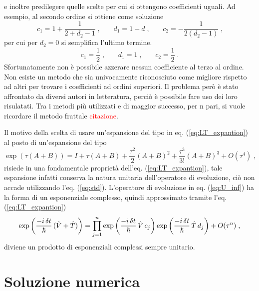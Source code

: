 e inoltre predilegere quelle scelte per cui si ottengono coefficienti uguali.
Ad esempio, al secondo ordine si ottiene come soluzione
\begin{equation}
    c_{1} = 1 + \frac{1}{2 + d_{2} -1}  \; \text{,} \qquad  d_{1} = 1 -d  \; \text{,} \qquad c_{2} = - \frac{1}{2(d_{2}-1)}  \; \text{,} 
    \label{eq:2_order_sol}
\end{equation}
per cui per $d_2 = 0$ si semplifica l'ultimo termine.
\begin{equation}
    c_{1} = \frac{1}{2} \; \text{,}  \qquad 
    d_{1} = 1 \; \text{,}  \qquad
    c_{2} = \frac{1}{2}  \; \text{.}
\end{equation}
Sfortunatamente non è possibile azzerare nessun coefficiente al terzo al ordine.
Non esiste un metodo che sia univocamente riconosciuto come migliore rispetto ad altri per trovare i coefficienti ad ordini superiori. Il problema però è stato affrontato da diversi autori in letteratura, perciò è possibile fare uso dei loro risulatati. Tra i metodi più utilizzati e di maggior successo, per n pari, si vuole ricordare il metodo frattale \textcolor{red}{citazione}.

Il motivo della scelta di usare un'espansione del tipo in eq. (\ref{eq:LT_expantion}) al posto di un'espansione del tipo 
\begin{equation}
         \exp \left(\tau ({A} + {B})\right) = I + \tau(A + B) + \frac{\tau^{2}}{2} (A + B)^2 + \frac{\tau^{3}}{3!} (A + B)^3 + O(\tau^{4})  \; \text{,} 
    \label{eq:std}
\end{equation}
risiede in una fondamentale proprietà dell'eq. (\ref{eq:LT_expantion}), tale espansione infatti conserva la natura unitaria dell'operatore di evoluzione, ciò non accade utilizzando l'eq. (\ref{eq:std})\cite{Hatano:exp}.
L'operatore di evoluzione in eq. (\ref{eq:U_inf}) ha la forma di un esponenziale complesso, quindi approssimato tramite l'eq. (\ref{eq:LT_expantion}) 
\begin{equation}
    \centering
     \exp \left(\frac{-i \, \delta t }{\hbar}  \, (\hat{V} + \hat{T})\right)   = \prod _{j=1} ^{n}  \exp \left(\frac{-i \, \delta t }{\hbar} \, \hat{V} \, c_{j}\right)   \exp \left(\frac{-i \, \delta t }{\hbar} \, \hat{T} \, d_{j}\right) + O(\tau^{n}) \; \text{,}
    \label{eq:sim_exp}
\end{equation}
diviene un prodotto di esponenziali complessi sempre unitario.

\section{Soluzione numerica} %
\label{sec:disc}

